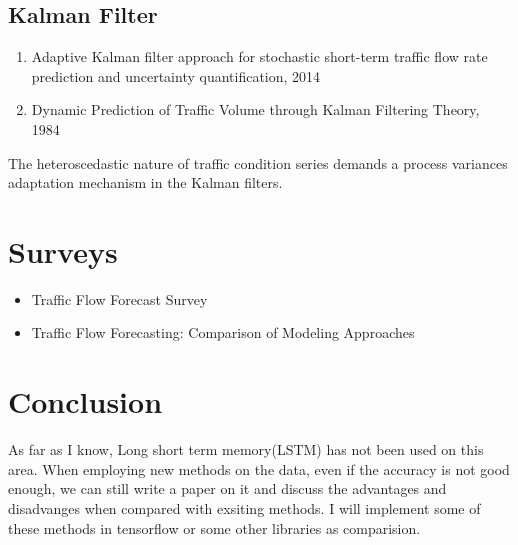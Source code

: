 \documentclass[11pt]{article}
\begin{document}
\subsection{Kalman Filter}
\begin{enumerate}
	\item Adaptive Kalman filter approach for stochastic short-term traffic flow rate prediction and uncertainty quantification, 2014
	\item Dynamic Prediction of Traffic Volume through Kalman Filtering Theory, 1984
\end{enumerate}
The heteroscedastic nature of traffic condition series demands a process variances adaptation mechanism in the Kalman filters.
\section{Surveys}
\begin{itemize}
	\item Traffic Flow Forecast Survey
	\item Traffic Flow Forecasting: Comparison of Modeling Approaches
\end{itemize}

\section{Conclusion}
As far as I know, Long short term memory(LSTM) has not been used on this area. When employing new methods on the data, even if the accuracy is not good enough, we can still write a paper on it and discuss the advantages and disadvanges when compared with exsiting methods. I will implement some of these methods in tensorflow or some other libraries as comparision. 
\end{document}

